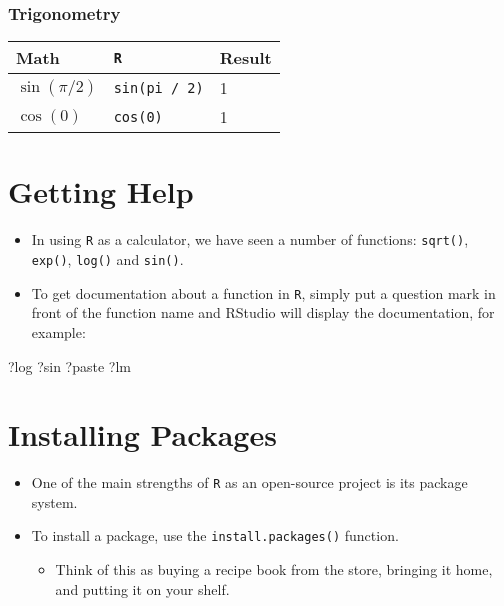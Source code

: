 \documentclass[]{book}
\newenvironment{Shaded}{\begin{snugshade}}{\end{snugshade}}
\newcommand{\NormalTok}[1]{#1}
\providecommand{\tightlist}{%
  \setlength{\itemsep}{0pt}\setlength{\parskip}{0pt}}
\begin{document}
\hypertarget{trigonometry}{%
\subsubsection*{Trigonometry}\label{trigonometry}}

\begin{longtable}[]{@{}lll@{}}
\toprule
Math & \texttt{R} & Result\tabularnewline
\midrule
\endhead
\(\sin(\pi / 2)\) & \texttt{sin(pi\ /\ 2)} & 1\tabularnewline
\(\cos(0)\) & \texttt{cos(0)} & 1\tabularnewline
\bottomrule
\end{longtable}

\hypertarget{getting-help}{%
\section{Getting Help}\label{getting-help}}

\begin{itemize}
\tightlist
\item
  In using \texttt{R} as a calculator, we have seen a number of functions: \texttt{sqrt()}, \texttt{exp()}, \texttt{log()} and \texttt{sin()}.
\item
  To get documentation about a function in \texttt{R}, simply put a question mark in front of the function name and RStudio will display the documentation, for example:
\end{itemize}

\begin{Shaded}
\begin{Highlighting}[]
\NormalTok{?log}
\NormalTok{?sin}
\NormalTok{?paste}
\NormalTok{?lm}
\end{Highlighting}
\end{Shaded}

\hypertarget{installing-packages}{%
\section{Installing Packages}\label{installing-packages}}

\begin{itemize}
\tightlist
\item
  One of the main strengths of \texttt{R} as an open-source project is its package system.
\item
  To install a package, use the \texttt{install.packages()} function.

  \begin{itemize}
  \tightlist
  \item
    Think of this as buying a recipe book from the store, bringing it home, and putting it on your shelf.
  \end{itemize}
\end{itemize}
\end{document}
